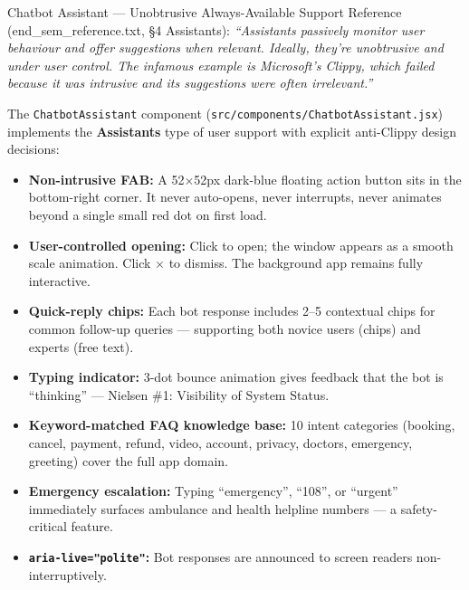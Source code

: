 \documentclass[12pt, a4paper]{article}
\begin{document}
\begin{featurebox}{Chatbot Assistant --- Unobtrusive Always-Available Support}
Reference (end\_sem\_reference.txt, §4 Assistants): \textit{``Assistants passively monitor user behaviour and offer suggestions when relevant. Ideally, they're unobtrusive and under user control. The infamous example is Microsoft's Clippy, which failed because it was intrusive and its suggestions were often irrelevant.''}

The \texttt{ChatbotAssistant} component (\texttt{src/components/ChatbotAssistant.jsx}) implements the \textbf{Assistants} type of user support with explicit anti-Clippy design decisions:

\begin{itemize}[leftmargin=1.5em, itemsep=0pt]
  \item \textbf{Non-intrusive FAB:} A 52$\times$52px dark-blue floating action button sits in the bottom-right corner. It never auto-opens, never interrupts, never animates beyond a single small red dot on first load.
  \item \textbf{User-controlled opening:} Click to open; the window appears as a smooth scale animation. Click $\times$ to dismiss. The background app remains fully interactive.
  \item \textbf{Quick-reply chips:} Each bot response includes 2--5 contextual chips for common follow-up queries --- supporting both novice users (chips) and experts (free text).
  \item \textbf{Typing indicator:} 3-dot bounce animation gives feedback that the bot is ``thinking'' --- Nielsen \#1: Visibility of System Status.
  \item \textbf{Keyword-matched FAQ knowledge base:} 10 intent categories (booking, cancel, payment, refund, video, account, privacy, doctors, emergency, greeting) cover the full app domain.
  \item \textbf{Emergency escalation:} Typing ``emergency'', ``108'', or ``urgent'' immediately surfaces ambulance and health helpline numbers --- a safety-critical feature.
  \item \textbf{\texttt{aria-live="polite"}:} Bot responses are announced to screen readers non-interruptively.
\end{itemize}
\end{featurebox}
\end{document}
